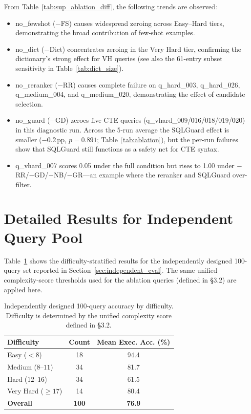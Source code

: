 \documentclass{npj-compt.mater}
\begin{document}
From Table~\ref{tab:sup_ablation_diff}, the following trends are
observed:
\begin{itemize}
  \item no\_fewshot ($-$FS) causes widespread zeroing across
    Easy--Hard tiers, demonstrating the broad contribution of
    few-shot examples.
  \item no\_dict ($-$Dict) concentrates zeroing in the Very Hard
    tier, confirming the dictionary's strong effect for
    VH queries (see also the 61-entry subset sensitivity in
    Table~\ref{tab:dict_size}).
  \item no\_reranker ($-$RR) causes complete failure on
    q\_hard\_003, q\_hard\_026, q\_medium\_004, and
    q\_medium\_020, demonstrating the effect of candidate
    selection.
  \item no\_guard ($-$GD) zeroes five CTE queries
    (q\_vhard\_009/016/018/019/020) in this diagnostic run.
    Across the 5-run average the SQLGuard effect is smaller
    ($-$0.2\,pp, $p=0.891$; Table~\ref{tab:ablation}), but the
    per-run failures show that SQLGuard still functions as a safety
    net for CTE syntax.
  \item q\_vhard\_007 scores 0.05 under the full condition but
    rises to 1.00 under $-$RR/$-$GD/$-$NB/$-$GR---an example
    where the reranker and SQLGuard over-filter.
\end{itemize}

\section{Detailed Results for Independent Query Pool}
\label{sec:sup_expert_queries}

Table~\ref{tab:sup_expert_summary} shows the difficulty-stratified
results for the independently designed 100-query set reported in
Section~\ref{sec:independent_eval}.
The same unified complexity-score thresholds used for the ablation
queries (defined in \S3.2) are applied here.

\begin{table}[htbp]
  \centering
  \caption{Independently designed 100-query accuracy by difficulty.
  Difficulty is determined by the unified complexity score defined in
  \S3.2.}
  \label{tab:sup_expert_summary}
  \small
  \begin{tabular}{lcc}
    \toprule
    Difficulty & Count & Mean Exec. Acc. (\%) \\
    \midrule
    Easy ($< 8$) & 18 & 94.4 \\
    Medium ($8$--$11$) & 34 & 81.7 \\
    Hard ($12$--$16$) & 34 & 61.5 \\
    Very Hard ($\geq 17$) & 14 & 80.4 \\
    \midrule
    \textbf{Overall} & \textbf{100} & \textbf{76.9} \\
    \bottomrule
  \end{tabular}
\end{table}
\end{document}
